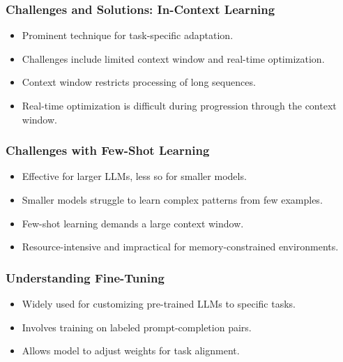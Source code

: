 \begin{frame}[fragile]\frametitle{Challenges and Solutions: In-Context Learning}
    \begin{itemize}
        \item Prominent technique for task-specific adaptation.
        \item Challenges include limited context window and real-time optimization.
        \item Context window restricts processing of long sequences.
        \item Real-time optimization is difficult during progression through the context window.
    \end{itemize}
\end{frame}

\begin{frame}[fragile]\frametitle{Challenges with Few-Shot Learning}
    \begin{itemize}
        \item Effective for larger LLMs, less so for smaller models.
        \item Smaller models struggle to learn complex patterns from few examples.
        \item Few-shot learning demands a large context window.
        \item Resource-intensive and impractical for memory-constrained environments.
    \end{itemize}
\end{frame}

\begin{frame}[fragile]\frametitle{Understanding Fine-Tuning}
    \begin{itemize}
        \item Widely used for customizing pre-trained LLMs to specific tasks.
        \item Involves training on labeled prompt-completion pairs.
        \item Allows model to adjust weights for task alignment.
    \end{itemize}
\end{frame}

